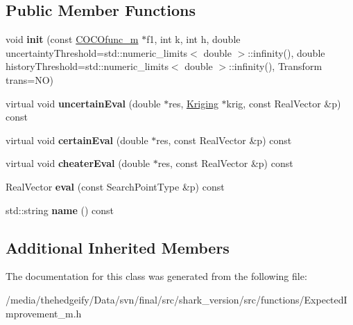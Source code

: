 \subsection*{Public Member Functions}
\begin{DoxyCompactItemize}
\item 
void {\bfseries init} (const \hyperlink{classCOCOfunc__m}{C\+O\+C\+Ofunc\+\_\+m} $\ast$f1, int k, int h, double uncertainty\+Threshold=std\+::numeric\+\_\+limits$<$ double $>$\+::infinity(), double history\+Threshold=std\+::numeric\+\_\+limits$<$ double $>$\+::infinity(), Transform trans=NO)\hypertarget{classExpectedImprovement__m_aa9ffa1caf2ca2d56ccf4d72ecf810fde}{}\label{classExpectedImprovement__m_aa9ffa1caf2ca2d56ccf4d72ecf810fde}

\item 
virtual void {\bfseries uncertain\+Eval} (double $\ast$res, \hyperlink{classKriging}{Kriging} $\ast$krig, const Real\+Vector \&p) const \hypertarget{classExpectedImprovement__m_af6c7bd01c68d5f7eaa108b33ede1c5dc}{}\label{classExpectedImprovement__m_af6c7bd01c68d5f7eaa108b33ede1c5dc}

\item 
virtual void {\bfseries certain\+Eval} (double $\ast$res, const Real\+Vector \&p) const \hypertarget{classExpectedImprovement__m_a45b3a4283ecef5af3d7cf7316edcc011}{}\label{classExpectedImprovement__m_a45b3a4283ecef5af3d7cf7316edcc011}

\item 
virtual void {\bfseries cheater\+Eval} (double $\ast$res, const Real\+Vector \&p) const \hypertarget{classExpectedImprovement__m_a1a2e7c457ea89e4da8b747eecc4a6af3}{}\label{classExpectedImprovement__m_a1a2e7c457ea89e4da8b747eecc4a6af3}

\item 
Real\+Vector {\bfseries eval} (const Search\+Point\+Type \&p) const \hypertarget{classExpectedImprovement__m_a0ba7345f119be6fc5c314e81fafa8cbf}{}\label{classExpectedImprovement__m_a0ba7345f119be6fc5c314e81fafa8cbf}

\item 
std\+::string {\bfseries name} () const \hypertarget{classExpectedImprovement__m_afc7e97d82a14d2a53a1edfd7b5a23a0f}{}\label{classExpectedImprovement__m_afc7e97d82a14d2a53a1edfd7b5a23a0f}

\end{DoxyCompactItemize}
\subsection*{Additional Inherited Members}


The documentation for this class was generated from the following file\+:\begin{DoxyCompactItemize}
\item 
/media/thehedgeify/\+Data/svn/final/src/shark\+\_\+version/src/functions/Expected\+Improvement\+\_\+m.\+h\end{DoxyCompactItemize}
